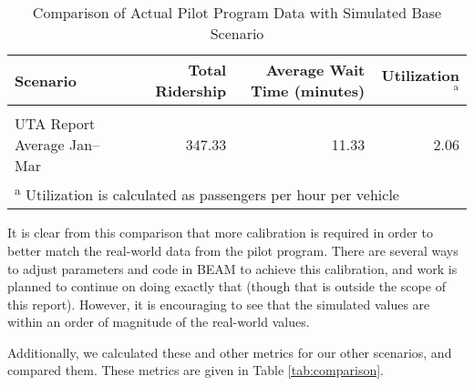 \documentclass[3p, authoryear]{elsarticle} %
\begin{document}
\begin{table}[H]

\caption{\label{tab:UTAComparison}Comparison of Actual Pilot Program Data with Simulated Base Scenario}
\centering
\begin{tabular}[t]{lrrr}
\toprule
Scenario & Total Ridership & Average Wait Time (minutes) & Utilization$^{\text{a}}$\\
\midrule
\cellcolor{gray!6}{South SL County only} & \cellcolor{gray!6}{1006.00} & \cellcolor{gray!6}{5.82} & \cellcolor{gray!6}{4.14}\\
UTA Report Average Jan--Mar & 347.33 & 11.33 & 2.06\\
\bottomrule
\multicolumn{4}{l}{\textsuperscript{a} Utilization is calculated as passengers per hour per vehicle}\\
\end{tabular}
\end{table}

It is clear from this comparison that more calibration is required in order to better match the real-world data from the pilot program. There are several ways to adjust parameters and code in BEAM to achieve this calibration, and work is planned to continue on doing exactly that (though that is outside the scope of this report). However, it is encouraging to see that the simulated values are within an order of magnitude of the real-world values.

Additionally, we calculated these and other metrics for our other scenarios, and compared them. These metrics are given in Table \ref{tab:comparison}.

\begin{table}[H]

\caption{\label{tab:comparison}Comparison of Simulated Scenarios}
\centering
{}
\end{table}
\end{document}
